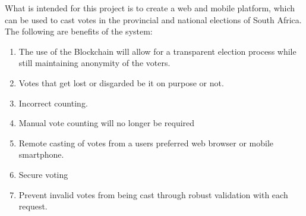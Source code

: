 What is intended for this project is to create a web and mobile platform, which can be used to cast votes in the provincial and national elections of South Africa. The following are benefits of the system:
	
	\begin{enumerate}
		\item The use of the Blockchain will allow for a transparent election process while still maintaining anonymity of the voters. 
		\item Votes that get lost or disgarded be it on purpose or not.
		\item Incorrect counting.
		\item Manual vote counting will no longer be required
		\item Remote casting of votes from a users preferred web browser or mobile smartphone. 
		\item Secure voting
		\item Prevent invalid votes from being cast through robust validation with each request.
	\end{enumerate}